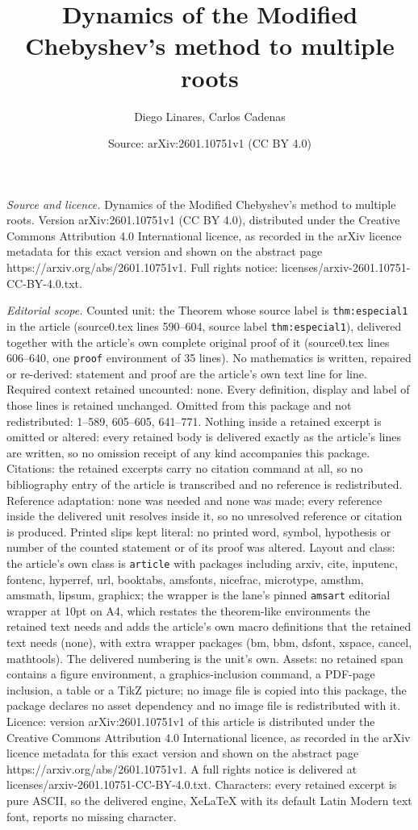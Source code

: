 \documentclass[10pt,a4paper]{amsart}
\title[Dynamics of the Modified Chebyshev's method to multiple root]{Dynamics of the Modified Chebyshev's method to multiple roots}
\author{Diego Linares, Carlos Cadenas}
\date{Source: arXiv:2601.10751v1 (CC BY 4.0)}
\begin{document}
\maketitle

\noindent\emph{Source and licence.} Dynamics of the Modified Chebyshev's method to multiple roots. Version arXiv:2601.10751v1 (CC BY 4.0), distributed under the Creative Commons Attribution 4.0 International licence, as recorded in the arXiv licence metadata for this exact version and shown on the abstract page https://arxiv.org/abs/2601.10751v1. Full rights notice: licenses/arxiv-2601.10751-CC-BY-4.0.txt.\par\smallskip

\noindent\textit{Editorial scope.} Counted unit: the Theorem whose source label is \texttt{thm:especial1} in the article (source0.tex lines 590--604, source label \texttt{thm:especial1}), delivered together with the article's own complete original proof of it (source0.tex lines 606--640, one \texttt{proof} environment of 35 lines). No mathematics is written, repaired or re-derived: statement and proof are the article's own text line for line. Required context retained uncounted: none. Every definition, display and label of those lines is retained unchanged. Omitted from this package and not redistributed: 1--589, 605--605, 641--771. Nothing inside a retained excerpt is omitted or altered: every retained body is delivered exactly as the article's lines are written, so no omission receipt of any kind accompanies this package. Citations: the retained excerpts carry no citation command at all, so no bibliography entry of the article is transcribed and no reference is redistributed. Reference adaptation: none was needed and none was made; every reference inside the delivered unit resolves inside it, so no unresolved reference or citation is produced. Printed slips kept literal: no printed word, symbol, hypothesis or number of the counted statement or of its proof was altered. Layout and class: the article's own class is \texttt{article} with packages including arxiv, cite, inputenc, fontenc, hyperref, url, booktabs, amsfonts, nicefrac, microtype, amsthm, amsmath, lipsum, graphicx; the wrapper is the lane's pinned \texttt{amsart} editorial wrapper at 10pt on A4, which restates the theorem-like environments the retained text needs and adds the article's own macro definitions that the retained text needs (none), with extra wrapper packages (bm, bbm, dsfont, xspace, cancel, mathtools). The delivered numbering is the unit's own. Assets: no retained span contains a figure environment, a graphics-inclusion command, a PDF-page inclusion, a table or a TikZ picture; no image file is copied into this package, the package declares no asset dependency and no image file is redistributed with it. Licence: version arXiv:2601.10751v1 of this article is distributed under the Creative Commons Attribution 4.0 International licence, as recorded in the arXiv licence metadata for this exact version and shown on the abstract page https://arxiv.org/abs/2601.10751v1. A full rights notice is delivered at licenses/arxiv-2601.10751-CC-BY-4.0.txt. Characters: every retained excerpt is pure ASCII, so the delivered engine, XeLaTeX with its default Latin Modern text font, reports no missing character.
\end{document}
